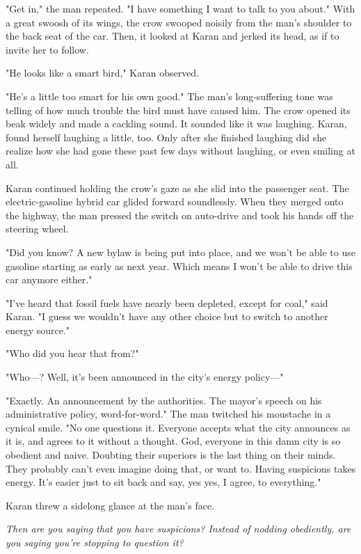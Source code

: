 "Get in," the man repeated. "I have something I want to talk to you
about." With a great swoosh of its wings, the crow swooped noisily from
the man's shoulder to the back seat of the car. Then, it looked at Karan
and jerked its head, as if to invite her to follow.

"He looks like a smart bird," Karan observed.

"He's a little too smart for his own good." The man's long-suffering
tone was telling of how much trouble the bird must have caused him. The
crow opened its beak widely and made a cackling sound. It sounded like
it was laughing. Karan, found herself laughing a little, too. Only after
she finished laughing did she realize how she had gone these past few
days without laughing, or even smiling at all.

Karan continued holding the crow's gaze as she slid into the passenger
seat. The electric-gasoline hybrid car glided forward soundlessly. When
they merged onto the highway, the man pressed the switch on auto-drive
and took his hands off the steering wheel.

"Did you know? A new bylaw is being put into place, and we won't be able
to use gasoline starting as early as next year. Which means I won't be
able to drive this car anymore either."

"I've heard that fossil fuels have nearly been depleted, except for
coal," said Karan. "I guess we wouldn't have any other choice but to
switch to another energy source."

"Who did you hear that from?"

"Who---? Well, it's been announced in the city's energy policy---"

"Exactly. An announcement by the authorities. The mayor's speech on his
administrative policy, word-for-word." The man twitched his moustache in
a cynical smile. "No one questions it. Everyone accepts what the city
announces as it is, and agrees to it without a thought. God, everyone in
this damn city is so obedient and naive. Doubting their superiors is the
last thing on their minds. They probably can't even imagine doing that,
or want to. Having suspicions takes energy. It's easier just to sit back
and say, yes yes, I agree, to everything."

Karan threw a sidelong glance at the man's face.

\emph{Then are you saying that you have suspicions? Instead of nodding
obediently, are you saying you're stopping to question it?}

